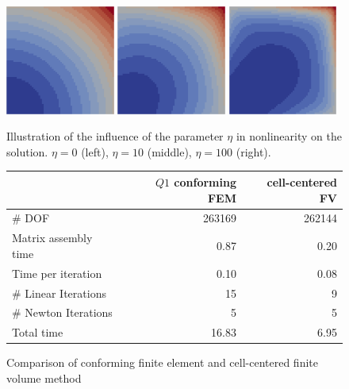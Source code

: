 \documentclass[a4paper,12pt]{article}
\begin{document}
\begin{figure}[h]
\begin{center}
\includegraphics[width=0.32\textwidth]{eta0}\hfill
\includegraphics[width=0.32\textwidth]{eta10}\hfill
\includegraphics[width=0.32\textwidth]{eta100}
\end{center}
\caption{Illustration of the influence of the parameter $\eta$
in nonlinearity on the solution. $\eta=0$ (left), $\eta=10$ (middle), $\eta=100$ (right).}
\label{fig:Bunt}
\end{figure}

\begin{figure}
\caption{Comparison of conforming finite element and cell-centered finite volume
method}
\label{fig:Compare}
\begin{center}
\begin{tabular}{l|r|r}
 & \multicolumn{1}{r|}{$Q1$ conforming FEM} & \multicolumn{1}{r}{cell-centered FV} \\
 \hline
 \# DOF & 263169 & 262144 \\
 Matrix assembly time & 0.87 & 0.20 \\
 Time per iteration & 0.10 & 0.08 \\
 \# Linear Iterations & 15 & 9 \\
 \# Newton Iterations & 5 & 5 \\
 Total time & 16.83 & 6.95
\end{tabular}
\end{center}
\end{figure}
\end{document}
